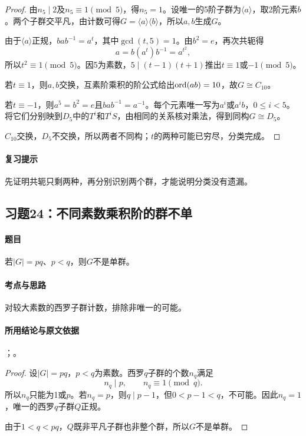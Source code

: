 \begin{proof}
由$n_5\mid2$及$n_5\equiv1\pmod5$，得$n_5=1$。设唯一的5阶子群为$\langle a\rangle$，取2阶元素$b$。两个子群交平凡，由计数可得$G=\langle a\rangle\langle b\rangle$，所以$a,b$生成$G$。

由于$\langle a\rangle$正规，$bab^{-1}=a^t$，其中$\gcd(t,5)=1$。由$b^2=e$，再次共轭得
\[
a=b(a^t)b^{-1}=a^{t^2},
\]
所以$t^2\equiv1\pmod5$。因5为素数，$5\mid(t-1)(t+1)$推出$t\equiv1$或$-1\pmod5$。

若$t\equiv1$，则$a,b$交换，互素阶乘积的阶公式给出$\operatorname{ord}(ab)=10$，故$G\cong C_{10}$。

若$t\equiv-1$，则$a^5=b^2=e$且$bab^{-1}=a^{-1}$。每个元素唯一写为$a^i$或$a^ib$，$0\leq i<5$。将它们分别映到$D_5$中的$T^i$和$T^iS$，由相同的关系核对乘法，得到同构$G\cong D_5$。

$C_{10}$交换，$D_5$不交换，所以两者不同构；$t$的两种可能已穷尽，分类完成。
\end{proof}

\paragraph{复习提示}
先证明共轭只剩两种，再分别识别两个群，才能说明分类没有遗漏。


\subsection{习题24：\texorpdfstring{不同素数乘积阶的群不单}{不同素数乘积阶的群不单}}
\label{ex:2:24}

\paragraph{题目}
若$|G|=pq$、$p<q$，则$G$不是单群。

\paragraph{考点与思路}
对较大素数的西罗子群计数，排除非唯一的可能。

\paragraph{所用结论与原文依据}
；。


\begin{proof}
设$|G|=pq$，$p<q$为素数。西罗$q$子群的个数$n_q$满足
\[
n_q\mid p,\qquad n_q\equiv1\pmod q.
\]
所以$n_q$只能为1或$p$。若$n_q=p$，则$q\mid p-1$，但$0<p-1<q$，不可能。因此$n_q=1$，唯一的西罗$q$子群$Q$正规。

由于$1<q<pq$，$Q$既非平凡子群也非整个群，所以$G$不是单群。
\end{proof}

